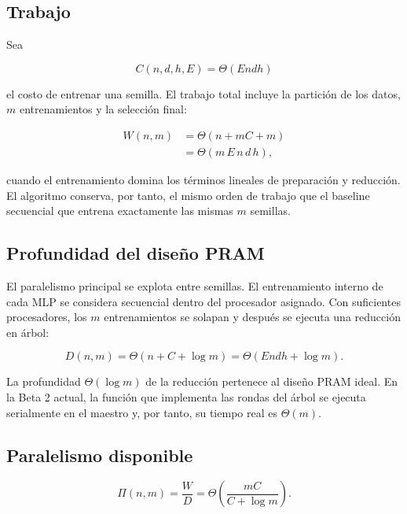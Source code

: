 \documentclass[11pt,a4paper]{article}
\newcommand{\Work}{W}
\newcommand{\Depth}{D}
\newcommand{\Cost}{C}
\begin{document}
\subsection{Trabajo}

Sea

\begin{equation}
    \Cost(n,d,h,E)=\Theta(E n d h)
\end{equation}

el costo de entrenar una semilla. El trabajo total incluye la partición de los datos,
$m$ entrenamientos y la selección final:

\begin{align}
    \Work(n,m)
    &= \Theta(n+m\Cost+m) \\
    &= \Theta(m\,E\,n\,d\,h),
    \label{eq:work}
\end{align}

cuando el entrenamiento domina los términos lineales de preparación y reducción.
El algoritmo conserva, por tanto, el mismo orden de trabajo que el baseline secuencial
que entrena exactamente las mismas $m$ semillas.

\subsection{Profundidad del diseño PRAM}

El paralelismo principal se explota entre semillas. El entrenamiento interno de cada MLP
se considera secuencial dentro del procesador asignado. Con suficientes procesadores,
los $m$ entrenamientos se solapan y después se ejecuta una reducción en árbol:

\begin{equation}
    \Depth(n,m)
    =
    \Theta\left(
        n+\Cost+\log m
    \right)
    =
    \Theta(E n d h+\log m).
    \label{eq:depth}
\end{equation}

La profundidad $\Theta(\log m)$ de la reducción pertenece al diseño PRAM ideal. En la
Beta 2 actual, la función que implementa las rondas del árbol se ejecuta serialmente en
el maestro y, por tanto, su tiempo real es $\Theta(m)$.

\subsection{Paralelismo disponible}

\begin{equation}
    \Pi(n,m)
    =
    \frac{\Work}{\Depth}
    =
    \Theta\left(
        \frac{m\Cost}
             {\Cost+\log m}
    \right).
    \label{eq:parallelism}
\end{equation}
\end{document}
